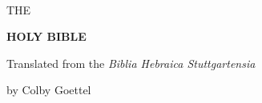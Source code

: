 \begin{titlepage}
    ~
    
    {\large THE}
    
    \medskip
    
    {\Huge \textbf{\textsc{HOLY BIBLE}}}
    
    \bigskip
    
    \bigskip
    
    \bigskip
    
    {\large Translated from the \emph{Biblia Hebraica Stuttgartensia}}
    
    \medskip
    
    {by Colby Goettel}
\end{titlepage}

